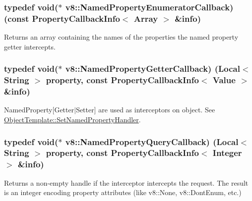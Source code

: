 \subsubsection[{\texorpdfstring{Named\+Property\+Enumerator\+Callback}{NamedPropertyEnumeratorCallback}}]{\setlength{\rightskip}{0pt plus 5cm}typedef void($\ast$ v8\+::\+Named\+Property\+Enumerator\+Callback) (const {\bf Property\+Callback\+Info}$<$ {\bf Array} $>$ \&info)}\hypertarget{namespacev8_a5f6f16818a9cddacadbfe6d90ca3a6b1}{}\label{namespacev8_a5f6f16818a9cddacadbfe6d90ca3a6b1}
Returns an array containing the names of the properties the named property getter intercepts. 
\subsubsection[{\texorpdfstring{Named\+Property\+Getter\+Callback}{NamedPropertyGetterCallback}}]{\setlength{\rightskip}{0pt plus 5cm}typedef void($\ast$ v8\+::\+Named\+Property\+Getter\+Callback) ({\bf Local}$<$ {\bf String} $>$ property, const {\bf Property\+Callback\+Info}$<$ {\bf Value} $>$ \&info)}\hypertarget{namespacev8_a50cae386a68bf9ff23d02aa1161face4}{}\label{namespacev8_a50cae386a68bf9ff23d02aa1161face4}
Named\+Property\mbox{[}Getter$\vert$\+Setter\mbox{]} are used as interceptors on object. See \hyperlink{classv8_1_1_object_template_a66fa7b04c87676e20e35497ea09a0ad0}{Object\+Template\+::\+Set\+Named\+Property\+Handler}. 
\subsubsection[{\texorpdfstring{Named\+Property\+Query\+Callback}{NamedPropertyQueryCallback}}]{\setlength{\rightskip}{0pt plus 5cm}typedef void($\ast$ v8\+::\+Named\+Property\+Query\+Callback) ({\bf Local}$<$ {\bf String} $>$ property, const {\bf Property\+Callback\+Info}$<$ {\bf Integer} $>$ \&info)}\hypertarget{namespacev8_ac135beae5f0c8b290255accb438f990e}{}\label{namespacev8_ac135beae5f0c8b290255accb438f990e}
Returns a non-\/empty handle if the interceptor intercepts the request. The result is an integer encoding property attributes (like v8\+::\+None, v8\+::\+Dont\+Enum, etc.) 

